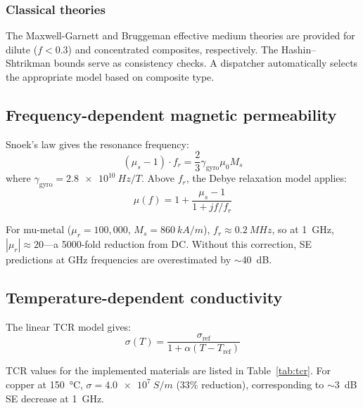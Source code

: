 \documentclass[review,3p,authoryear]{elsarticle}
\begin{document}
\subsubsection{Classical theories}

The Maxwell-Garnett \citep{MaxwellGarnett1904} and Bruggeman \citep{Bruggeman1935} effective medium theories are provided for dilute ($f < 0.3$) and concentrated composites, respectively. The Hashin--Shtrikman bounds \citep{Hashin1962} serve as consistency checks. A dispatcher automatically selects the appropriate model based on composite type.

\subsection{Frequency-dependent magnetic permeability}
\label{sec:snoek}

Snoek's law \citep{Snoek1948} gives the resonance frequency:
\begin{equation}
(\mu_s - 1) \cdot f_r = \frac{2}{3}\gamma_\mathrm{gyro}\mu_0 M_s
\label{eq:snoek}
\end{equation}
where $\gamma_\mathrm{gyro} = \SI{2.8e10}{Hz/T}$. Above $f_r$, the Debye relaxation model applies:
\begin{equation}
\mu(f) = 1 + \frac{\mu_s - 1}{1 + jf/f_r}
\label{eq:debye}
\end{equation}

For mu-metal ($\mu_r = 100{,}000$, $M_s = \SI{860}{kA/m}$), $f_r \approx \SI{0.2}{MHz}$, so at \SI{1}{GHz}, $|\mu_r| \approx 20$---a 5000-fold reduction from DC. Without this correction, SE predictions at GHz frequencies are overestimated by $\sim$40~dB.

\subsection{Temperature-dependent conductivity}
\label{sec:tcr}

The linear TCR model \citep{Matula1979} gives:
\begin{equation}
\sigma(T) = \frac{\sigma_\mathrm{ref}}{1 + \alpha(T - T_\mathrm{ref})}
\label{eq:tcr}
\end{equation}

TCR values for the implemented materials are listed in Table~\ref{tab:tcr}. For copper at \SI{150}{\degreeCelsius}, $\sigma = \SI{4.0e7}{S/m}$ (33\% reduction), corresponding to $\sim$\SI{3}{dB} SE decrease at \SI{1}{GHz}.
\end{document}
